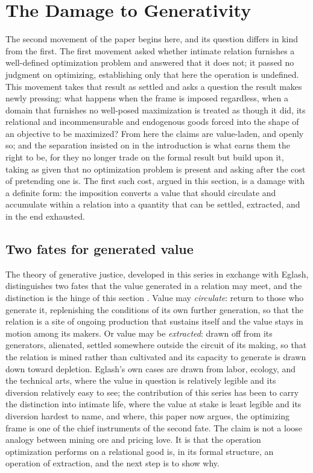 \section{The Damage to Generativity}
\label{p25:sec:damage}

\noindent
The second movement of the paper begins here, and its question differs in kind from the first. The first movement asked whether intimate relation furnishes a well-defined optimization problem and answered that it does not; it passed no judgment on optimizing, establishing only that here the operation is undefined. This movement takes that result as settled and asks a question the result makes newly pressing: what happens when the frame is imposed regardless, when a domain that furnishes no well-posed maximization is treated as though it did, its relational and incommensurable and endogenous goods forced into the shape of an objective to be maximized? From here the claims are value-laden, and openly so; and the separation insisted on in the introduction is what earns them the right to be, for they no longer trade on the formal result but build upon it, taking as given that no optimization problem is present and asking after the cost of pretending one is. The first such cost, argued in this section, is a damage with a definite form: the imposition converts a value that should circulate and accumulate within a relation into a quantity that can be settled, extracted, and in the end exhausted.

\subsection*{Two fates for generated value}

The theory of generative justice, developed in this series in exchange with Eglash, distinguishes two fates that the value generated in a relation may meet, and the distinction is the hinge of this section \parencite{eglash2016}. Value may \emph{circulate}: return to those who generate it, replenishing the conditions of its own further generation, so that the relation is a site of ongoing production that sustains itself and the value stays in motion among its makers. Or value may be \emph{extracted}: drawn off from its generators, alienated, settled somewhere outside the circuit of its making, so that the relation is mined rather than cultivated and its capacity to generate is drawn down toward depletion. Eglash's own cases are drawn from labor, ecology, and the technical arts, where the value in question is relatively legible and its diversion relatively easy to see; the contribution of this series has been to carry the distinction into intimate life, where the value at stake is least legible and its diversion hardest to name, and where, this paper now argues, the optimizing frame is one of the chief instruments of the second fate. The claim is not a loose analogy between mining ore and pricing love. It is that the operation optimization performs on a relational good is, in its formal structure, an operation of extraction, and the next step is to show why.

